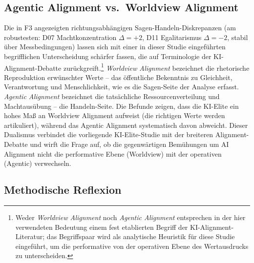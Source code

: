 \documentclass[12pt,a4paper]{article}
\begin{document}
\subsection{Agentic Alignment vs.\ Worldview Alignment}
\label{sec:diskussion:alignment}

Die in F3 angezeigten richtungsabhängigen Sagen-Handeln-Diskrepanzen (am robustesten: D07 Machtkonzentration $\Delta = +2$, D11 Egalitarismus $\Delta = -2$, stabil über Messbedingungen) lassen sich mit einer in dieser Studie eingeführten begrifflichen Unterscheidung schärfer fassen, die auf Terminologie der KI-Alignment-Debatte zurückgreift.\footnote{Weder \emph{Worldview Alignment} noch \emph{Agentic Alignment} entsprechen in der hier verwendeten Bedeutung einem fest etablierten Begriff der KI-Alignment-Literatur; das Begriffspaar wird als analytische Heuristik für diese Studie eingeführt, um die performative von der operativen Ebene des Wertausdrucks zu unterscheiden.} \emph{Worldview Alignment} bezeichnet die rhetorische Reproduktion erwünschter Werte -- das öffentliche Bekenntnis zu Gleichheit, Verantwortung und Menschlichkeit, wie es die \glqq Sagen\grqq-Seite der Analyse erfasst. \emph{Agentic Alignment} bezeichnet die tatsächliche Ressourcenverteilung und Macht\-ausübung -- die \glqq Handeln\grqq-Seite. Die Befunde zeigen, dass die KI-Elite ein hohes Maß an Worldview Alignment aufweist (die \glqq richtigen\grqq{} Werte werden artikuliert), während das Agentic Alignment systematisch davon abweicht. Dieser Dualismus verbindet die vorliegende KI-Elite-Studie mit der breiteren Alignment-Debatte und wirft die Frage auf, ob die gegenwärtigen Bemühungen um \glqq AI Alignment\grqq{} nicht die performative Ebene (Worldview) mit der operativen (Agentic) verwechseln.


\subsection{Methodische Reflexion}
\label{sec:diskussion:methodik}
\end{document}
